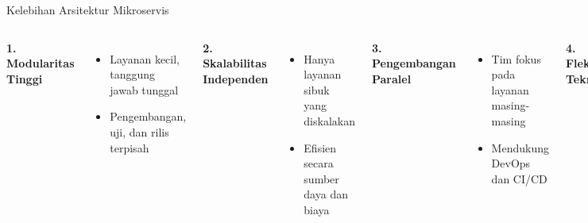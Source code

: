 \documentclass[aspectratio=169, table]{beamer}
\begin{document}
\begin{frame}[fragile]{Kelebihan Arsitektur Mikroservis}
	\vspace{10pt}
	\begin{columns}[T]
		\textbf{1. Modularitas Tinggi}
		\begin{itemize}
			\item Layanan kecil, tanggung jawab tunggal
			\item Pengembangan, uji, dan rilis terpisah
		\end{itemize}
		
		\textbf{2. Skalabilitas Independen}
		\begin{itemize}
			\item Hanya layanan sibuk yang diskalakan
			\item Efisien secara sumber daya dan biaya
		\end{itemize}
		
		\textbf{3. Pengembangan Paralel}
		\begin{itemize}
			\item Tim fokus pada layanan masing-masing
			\item Mendukung DevOps dan CI/CD
		\end{itemize}
		
		\textbf{4. Fleksibilitas Teknologi}
		\begin{itemize}
			\item Tiap layanan bebas pilih teknologi
			\item \textit{Polyglot programming \& persistence}
		\end{itemize}
		
		\textbf{5. Isolasi Kegagalan}
		\begin{itemize}
			\item Gangguan satu layanan tak jatuhkan sistem
			\item Bisa gunakan circuit breaker, retry
		\end{itemize}
	\end{columns}
\end{frame}
\end{document}

